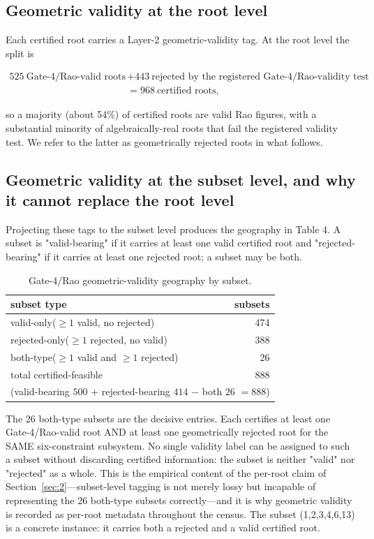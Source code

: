 \documentclass[pdflatex,sn-mathphys-num]{sn-jnl}
\begin{document}
\subsection{Geometric validity at the root level}\label{sec:6.2}

Each certified root carries a Layer-2 geometric-validity tag. At the root level the split is

\[
\begin{aligned}
525\ \text{Gate-4/Rao-valid roots}
&+443\ \text{rejected by the registered Gate-4/Rao-validity test}\\
&=968\ \text{certified roots},
\end{aligned}
\]

so a majority (about 54\%) of certified roots are valid Rao figures, with a substantial minority of algebraically-real roots that fail the registered validity test. We refer to the latter as geometrically rejected roots in what follows.

\subsection{Geometric validity at the subset level, and why it cannot replace the root level}\label{sec:6.3}

Projecting these tags to the subset level produces the geography in Table 4. A subset is "valid-bearing" if it carries at least one valid certified root and "rejected-bearing" if it carries at least one rejected root; a subset may be both.

\begin{table}[htbp]
\centering
\caption{Gate-4/Rao geometric-validity geography by subset.}
\label{tab:geography}
\begin{tabular}{lr}\hline
subset type & subsets \\\hline
valid-only\quad($\ge 1$ valid, no rejected) & 474 \\
rejected-only\quad($\ge 1$ rejected, no valid) & 388 \\
both-type\quad($\ge 1$ valid and $\ge 1$ rejected) & 26 \\\hline
total certified-feasible & 888 \\\hline
\multicolumn{2}{l}{\small (valid-bearing $500$ $+$ rejected-bearing $414$ $-$ both $26$ $=888$)} \\\hline
\end{tabular}
\end{table}

The 26 both-type subsets are the decisive entries. Each certifies at least one Gate-4/Rao-valid root AND at least one geometrically rejected root for the SAME six-constraint subsystem. No single validity label can be assigned to such a subset without discarding certified information: the subset is neither "valid" nor "rejected" as a whole. This is the empirical content of the per-root claim of
Section~\ref{sec:2}---subset-level tagging is not merely lossy but incapable of representing the 26 both-type subsets correctly---and it is why geometric validity is recorded as per-root metadata throughout the census. The subset (1,2,3,4,6,13) is a concrete instance: it carries both a rejected and a valid
certified root.
\end{document}
